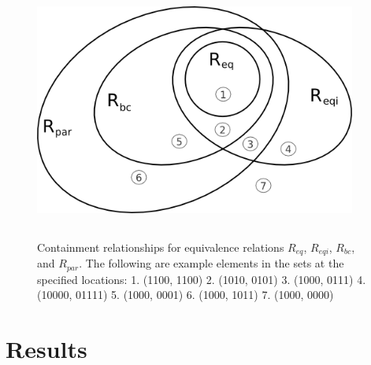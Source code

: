 \documentclass{article}
\theoremstyle{definition}
\begin{document}
\begin{figure}
  \begin{center}
    \includegraphics[width=300pt,height=241pt,keepaspectratio=true]
                    {containments.png}
  \end{center}
  \caption{ \label{fig:containments} Containment relationships for equivalence
    relations $R_{eq}$, $R_{eqi}$, $R_{bc}$, and $R_{par}$. The following are
    example elements in the sets at the specified locations: 1. (1100, 1100)
    2. (1010, 0101) 3. (1000, 0111) 4. (10000, 01111) 5. (1000, 0001) 6. (1000,
    1011) 7. (1000, 0000) }
\end{figure}

\section{Results}
\end{document}

